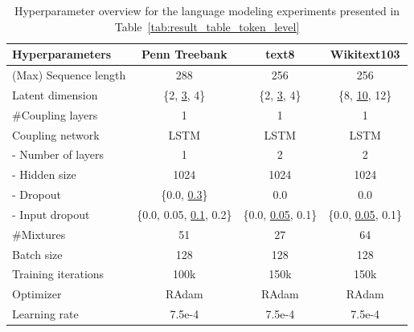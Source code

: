 \begin{table}[ht!]
    \centering
    \caption[Hyperparameter overview for the language modeling experiments]{Hyperparameter overview for the language modeling experiments presented in Table~\ref{tab:result_table_token_level}}
    \label{tab:appendix_hyperparameters_language_modeling}
    \renewcommand{\arraystretch}{1.2}
    \begin{tabular}{lccc}
        \toprule
        \textbf{Hyperparameters} & \textbf{Penn Treebank} & \textbf{text8} & \textbf{Wikitext103}\\
        \midrule
        (Max) Sequence length & 288 & 256 & 256 \\
        Latent dimension & \{2, \underline{3}, 4\} & \{2, \underline{3}, 4\} & \{8, \underline{10}, 12\}\\
        \#Coupling layers & 1 & 1 & 1 \\
        Coupling network & LSTM & LSTM & LSTM \\
        - Number of layers & 1 & 2 & 2 \\
        - Hidden size & 1024 & 1024 & 1024 \\
        - Dropout & \{0.0, \underline{0.3}\} & 0.0 & 0.0 \\
        - Input dropout & \{0.0, 0.05, \underline{0.1}, 0.2\} & \{0.0, \underline{0.05}, 0.1\} & \{0.0, \underline{0.05}, 0.1\} \\
        \#Mixtures & 51 & 27 & 64 \\
        Batch size & 128 & 128 & 128\\
        Training iterations & 100k & 150k & 150k\\
        Optimizer & RAdam & RAdam & RAdam\\
        Learning rate & 7.5e-4 & 7.5e-4 & 7.5e-4 \\
        \bottomrule
    \end{tabular}
\end{table}

